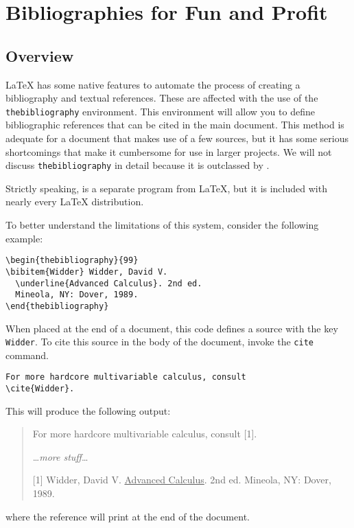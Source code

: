 \chapter[Bibliographies]{Bibliographies for Fun and Profit}
\label{cha:bibl-fun-prof}

\section{Overview}
\label{sec:overview}

\LaTeX{} has some native features to automate the process of creating
a bibliography and textual references.  These are affected with the use
of the \texttt{thebibliography} environment.  This environment will
allow you to define bibliographic references that can be cited in the
main document.  This method is adequate for a document that makes use
of a few sources, but it has some serious shortcomings that make it
cumbersome for use in larger projects.  We will not discuss
\texttt{thebibliography} in detail because it is outclassed by
\BibTeX{}.

Strictly speaking, \BibTeX{} is a separate program from \LaTeX{}, but
it is included with nearly every \LaTeX{} distribution.

To better understand the limitations of this system, consider the
following example:
\begin{verbatim}
\begin{thebibliography}{99}
\bibitem{Widder} Widder, David V.
  \underline{Advanced Calculus}. 2nd ed.
  Mineola, NY: Dover, 1989.
\end{thebibliography}
\end{verbatim}

When placed at the end of a document, this code defines a source with
the key \texttt{Widder}.  To cite this source in the body of the
document, invoke the \texttt{cite} command.
\begin{verbatim}
For more hardcore multivariable calculus, consult
\cite{Widder}.
\end{verbatim}

This will produce the following output:
\begin{quotation}
  For more hardcore multivariable calculus, consult [1].
  
  \ldots{}\textit{more stuff}\ldots{}
  
  [1] Widder, David V. \underline{Advanced Calculus}. 2nd ed. Mineola,
  NY: Dover, 1989.
\end{quotation}
where the reference will print at the end of the document.

